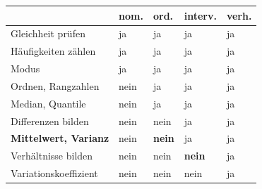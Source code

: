 \begin{merksatz}
\begin{center}
{\small
\renewcommand{\arraystretch}{1.42}
\begin{tabular}{@{}P{3.2cm}P{1.2cm}P{1.2cm}P{1.4cm}P{1.4cm}@{}}
\toprule
& \textbf{nom.} & \textbf{ord.} & \textbf{interv.} & \textbf{verh.}\\
\midrule
Gleichheit prüfen & \textcolor{gruen}{ja} & \textcolor{gruen}{ja} & \textcolor{gruen}{ja} & \textcolor{gruen}{ja}\\
Häufigkeiten zählen & \textcolor{gruen}{ja} & \textcolor{gruen}{ja} & \textcolor{gruen}{ja} & \textcolor{gruen}{ja}\\
Modus & \textcolor{gruen}{ja} & \textcolor{gruen}{ja} & \textcolor{gruen}{ja} & \textcolor{gruen}{ja}\\
Ordnen, Rangzahlen & \textcolor{akzent}{nein} & \textcolor{gruen}{ja} & \textcolor{gruen}{ja} & \textcolor{gruen}{ja}\\
Median, Quantile & \textcolor{akzent}{nein} & \textcolor{gruen}{ja} & \textcolor{gruen}{ja} & \textcolor{gruen}{ja}\\
Differenzen bilden & \textcolor{akzent}{nein} & \textcolor{akzent}{nein} & \textcolor{gruen}{ja} & \textcolor{gruen}{ja}\\
\textbf{Mittelwert, Varianz} & \textcolor{akzent}{nein} & \textcolor{akzent}{\textbf{nein}} & \textcolor{gruen}{ja} & \textcolor{gruen}{ja}\\
Verhältnisse bilden & \textcolor{akzent}{nein} & \textcolor{akzent}{nein} & \textcolor{akzent}{\textbf{nein}} & \textcolor{gruen}{ja}\\
Variations\-koeffizient & \textcolor{akzent}{nein} & \textcolor{akzent}{nein} & \textcolor{akzent}{nein} & \textcolor{gruen}{ja}\\
\bottomrule
\end{tabular}}
\end{center}

\begin{center}
\begin{minipage}{0.88\textwidth}
\end{minipage}
\end{center}
\end{merksatz}

